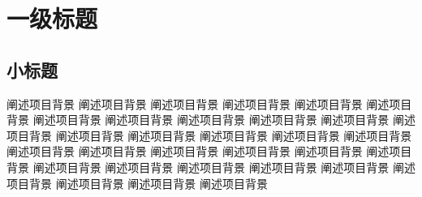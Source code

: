 \newpage
\section{一级标题}

\songti\text

\subsection{小标题}
阐述项目背景 阐述项目背景 阐述项目背景 阐述项目背景 阐述项目背景 阐述项目背景 阐述项目背景 阐述项目背景 阐述项目背景 阐述项目背景 阐述项目背景 阐述项目背景 阐述项目背景 阐述项目背景 阐述项目背景 阐述项目背景 阐述项目背景 阐述项目背景 阐述项目背景 阐述项目背景 阐述项目背景 阐述项目背景 阐述项目背景 阐述项目背景 阐述项目背景 阐述项目背景 阐述项目背景 阐述项目背景 阐述项目背景 阐述项目背景 阐述项目背景 阐述项目背景
